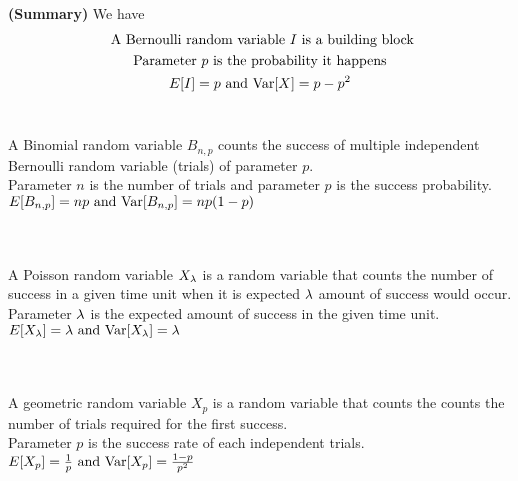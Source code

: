 \documentclass{report}
\begin{document}
\begin{theorem}
\textbf{(Summary)} We have
\begin{gather}
\text{ A Bernoulli random variable $I$ is a building block}\\
\text{ Parameter $p$ is the probability it happens }\\
E[I]=p \text{ and }\text{Var} [X]=p-p^2
\end{gather}\\

\begin{center}
    \begin{minipage}{0.9\linewidth}  
        \centering
         A Binomial random variable $B_{n,p}$ counts the success of multiple independent Bernoulli random variable (trials) of parameter $p$. \\
         Parameter $n$ is the number of trials and parameter $p$ is the success probability.\\
         $E[B_{n,p}]=np \text{ and }\text{Var} [B_{n,p}]=np(1-p)$
    \end{minipage}
\end{center}\\
\begin{gather}

\end{gather}
\begin{center}
    \begin{minipage}{0.9\linewidth}  
        \centering
        A Poisson random variable  $X_{\lambda }$ is a random variable that counts the number of success in a given time unit when it is expected $\lambda $ amount of success would occur.\\

        Parameter $\lambda $ is the expected amount of success in the given time unit.\\

        $E[X_\lambda ]=\lambda \text{ and }\text{Var} [X_\lambda ]=\lambda $
    \end{minipage}
\end{center}\\
\begin{gather}

\end{gather}
\begin{center}
    \begin{minipage}{0.9\linewidth}  
        \centering
        A geometric random variable $X_p$ is a random variable that counts the counts the number of trials required for the first success.\\
        
        Parameter  $p$ is the success rate of each independent trials.\\

        $E[X_p]=\frac{1}{p}\text{ and }\text{Var} [X_p]=\frac{1-p}{p^2}$
    \end{minipage}
\end{center}
\end{theorem}
\end{document}
